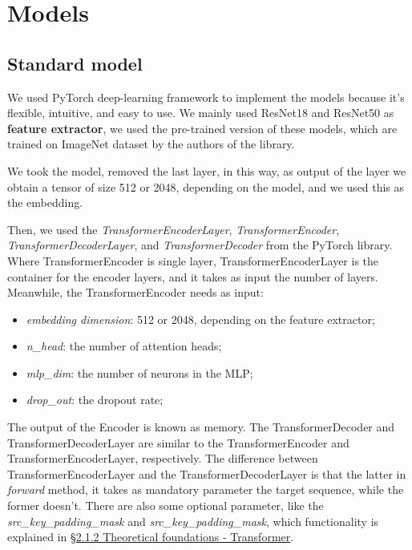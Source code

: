 \section{Models}\label{sec:models}

\subsection{Standard model}\label{subsec:standard-model}
We used PyTorch deep-learning framework to implement the models because it's flexible, intuitive, and easy to use.
We mainly used ResNet18 and ResNet50 as \textbf{feature extractor}, we used the pre-trained version of these models, which are trained on ImageNet dataset by the authors of the library.

We took the model, removed the last layer, in this way, as output of the layer we obtain a tensor of size 512 or 2048, depending on the model, and we used this as the embedding.

Then, we used the \textit{TransformerEncoderLayer}, \textit{TransformerEncoder}, \textit{TransformerDecoderLayer}, and \textit{TransformerDecoder} from the PyTorch library.
Where TransformerEncoder is single layer, TransformerEncoderLayer is the container for the encoder layers, and it takes as input the number of layers.
Meanwhile, the TransformerEncoder needs as input:
\begin{itemize}
    \item \textit{embedding dimension}: 512 or 2048, depending on the feature extractor;
    \item \textit{n\_head}: the number of attention heads;
    \item \textit{mlp\_dim}: the number of neurons in the MLP;
    \item \textit{drop\_out}: the dropout rate;
\end{itemize}
The output of the Encoder is known as memory.
The TransformerDecoder and TransformerDecoderLayer are similar to the TransformerEncoder and TransformerEncoderLayer, respectively.
The difference between TransformerEncoderLayer and the TransformerDecoderLayer is that the latter in \textit{forward} method, it takes as mandatory parameter the target sequence, while the former doesn't.
There are also some optional parameter, like the \textit{src\_key\_padding\_mask} and \textit{src\_key\_padding\_mask}, which functionality is explained in \hyperref[subsec:transformer]{\S2.1.2 Theoretical foundations - Transformer}.

